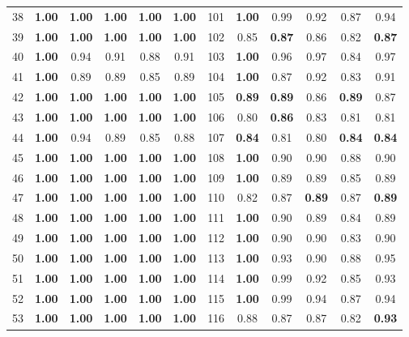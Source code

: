 \documentclass{article}
\begin{document}
{\begin{longtable}{cccccc@{\qquad}cccccc}
38 & \textbf{1.00} & \textbf{1.00} & \textbf{1.00} & \textbf{1.00} & \textbf{1.00} & 101 & \textbf{1.00} & 0.99 & 0.92 & 0.87 & 0.94 \\
39 & \textbf{1.00} & \textbf{1.00} & \textbf{1.00} & \textbf{1.00} & \textbf{1.00} & 102 & 0.85 & \textbf{0.87} & 0.86 & 0.82 & \textbf{0.87} \\
40 & \textbf{1.00} & 0.94 & 0.91 & 0.88 & 0.91 & 103 & \textbf{1.00} & 0.96 & 0.97 & 0.84 & 0.97 \\
41 & \textbf{1.00} & 0.89 & 0.89 & 0.85 & 0.89 & 104 & \textbf{1.00} & 0.87 & 0.92 & 0.83 & 0.91 \\
42 & \textbf{1.00} & \textbf{1.00} & \textbf{1.00} & \textbf{1.00} & \textbf{1.00} & 105 & \textbf{0.89} & \textbf{0.89} & 0.86 & \textbf{0.89} & 0.87 \\
43 & \textbf{1.00} & \textbf{1.00} & \textbf{1.00} & \textbf{1.00} & \textbf{1.00} & 106 & 0.80 & \textbf{0.86} & 0.83 & 0.81 & 0.81 \\
44 & \textbf{1.00} & 0.94 & 0.89 & 0.85 & 0.88 & 107 & \textbf{0.84} & 0.81 & 0.80 & \textbf{0.84} & \textbf{0.84} \\
45 & \textbf{1.00} & \textbf{1.00} & \textbf{1.00} & \textbf{1.00} & \textbf{1.00} & 108 & \textbf{1.00} & 0.90 & 0.90 & 0.88 & 0.90 \\
46 & \textbf{1.00} & \textbf{1.00} & \textbf{1.00} & \textbf{1.00} & \textbf{1.00} & 109 & \textbf{1.00} & 0.89 & 0.89 & 0.85 & 0.89 \\
47 & \textbf{1.00} & \textbf{1.00} & \textbf{1.00} & \textbf{1.00} & \textbf{1.00} & 110 & 0.82 & 0.87 & \textbf{0.89} & 0.87 & \textbf{0.89} \\
48 & \textbf{1.00} & \textbf{1.00} & \textbf{1.00} & \textbf{1.00} & \textbf{1.00} & 111 & \textbf{1.00} & 0.90 & 0.89 & 0.84 & 0.89 \\
49 & \textbf{1.00} & \textbf{1.00} & \textbf{1.00} & \textbf{1.00} & \textbf{1.00} & 112 & \textbf{1.00} & 0.90 & 0.90 & 0.83 & 0.90 \\
50 & \textbf{1.00} & \textbf{1.00} & \textbf{1.00} & \textbf{1.00} & \textbf{1.00} & 113 & \textbf{1.00} & 0.93 & 0.90 & 0.88 & 0.95 \\
51 & \textbf{1.00} & \textbf{1.00} & \textbf{1.00} & \textbf{1.00} & \textbf{1.00} & 114 & \textbf{1.00} & 0.99 & 0.92 & 0.85 & 0.93 \\
52 & \textbf{1.00} & \textbf{1.00} & \textbf{1.00} & \textbf{1.00} & \textbf{1.00} & 115 & \textbf{1.00} & 0.99 & 0.94 & 0.87 & 0.94 \\
53 & \textbf{1.00} & \textbf{1.00} & \textbf{1.00} & \textbf{1.00} & \textbf{1.00} & 116 & 0.88 & 0.87 & 0.87 & 0.82 & \textbf{0.93} \\

\end{longtable}}
\end{document}
